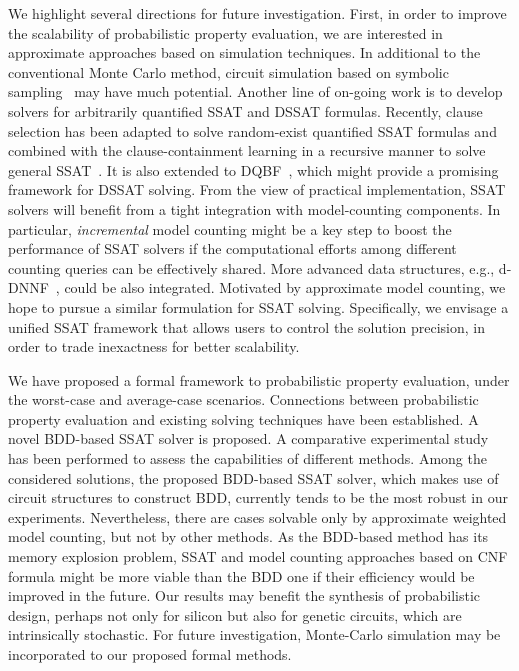 We highlight several directions for future investigation.
First, in order to improve the scalability of probabilistic property evaluation,
we are interested in approximate approaches based on simulation techniques.
In additional to the conventional Monte Carlo method,
circuit simulation based on symbolic sampling~\cite{KravetsDAC19ECOSampling} may have much potential.
Another line of on-going work is to develop solvers for arbitrarily quantified SSAT and DSSAT formulas.
Recently, clause selection has been adapted to solve random-exist quantified SSAT formulas
and combined with the clause-containment learning in a recursive manner to solve general SSAT~\cite{Chen2021}.
It is also extended to DQBF~\cite{Tentrup2019},
which might provide a promising framework for DSSAT solving.
From the view of practical implementation,
SSAT solvers will benefit from a tight integration with model-counting components.
In particular, \textit{incremental} model counting might be a key step to boost the performance of SSAT solvers
if the computational efforts among different counting queries can be effectively shared.
More advanced data structures, e.g., d-DNNF~\cite{Darwiche2001,Darwiche2002dDNNF}, could be also integrated.
Motivated by approximate model counting,
we hope to pursue a similar formulation for SSAT solving.
Specifically, we envisage a unified SSAT framework that allows users to control the solution precision,
in order to trade inexactness for better scalability.

\iffalse
    We have proposed a formal framework to probabilistic property
    evaluation, under the worst-case and average-case scenarios.
    Connections between probabilistic property evaluation and existing
    solving techniques have been established. A novel BDD-based SSAT solver is proposed. A comparative experimental study has been performed to assess the capabilities
    of different methods. Among the considered solutions, the proposed BDD-based SSAT solver, which makes use of circuit structures to construct BDD, currently tends to be the most robust in our experiments. Nevertheless, there are cases solvable only by approximate weighted model counting, but not by other methods. As the BDD-based method has its memory explosion problem, SSAT and model
    counting approaches based on CNF formula might be more viable than the BDD one if their efficiency would be improved in the future. Our results may benefit the synthesis of probabilistic design, perhaps not only for silicon but also for genetic circuits, which are intrinsically stochastic. For future investigation, Monte-Carlo simulation may be incorporated to our proposed formal methods.

